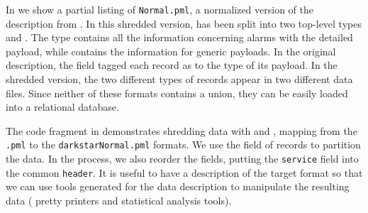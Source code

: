 In  we show a partial listing of
\texttt{\darkstar{}Normal.pml}, a normalized version of the \darkstar{}
description from . In this shredded version,
 has been split into two top-level types  and
.  The type  contains all the information
concerning alarms with the detailed payload, while 
contains the information for generic payloads.  In the original
description, the  field tagged each record as to the type of
its payload.  In the shredded version, the two different types of
records appear in two different data files. Since neither of these
formats contains a union, they can be easily loaded into a relational
database. 

The code fragment in  demonstrates
shredding \darkstar{} data with \padsml{} and \ocaml{}, mapping from
the \texttt{\darkstar{}.pml} to the \texttt{darkstar{}Normal.pml}
formats. We use the  field of  records to partition
the data. In the process, we also reorder the fields, 
putting the \texttt{service} field into the common \texttt{header}.
It is useful to have a \padsml{} description of the target format so
that we can use tools generated for the data description to manipulate
the resulting data (\eg{} pretty printers and statistical analysis tools).


